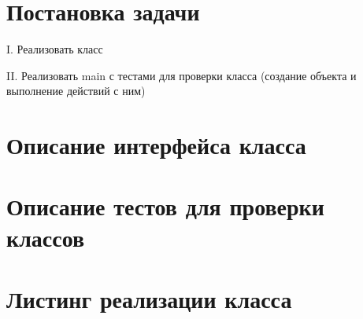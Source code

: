 \documentclass[14pt, a4paper]{extreport}
\begin{document}
\author{Савонин~М.В.}
\maketitle

\chapter{Постановка задачи}

I. Реализовать класс


II. Реализовать main с тестами для проверки класса (создание объекта и
выполнение действий с ним)

\chapter{Описание интерфейса класса}



\chapter{Описание тестов для проверки классов}



\chapter{Листинг реализации класса}



\end{document}
